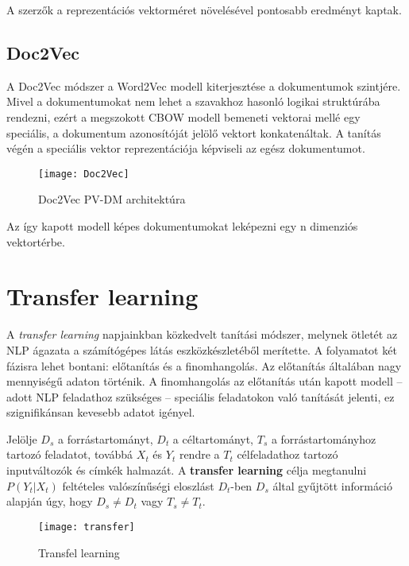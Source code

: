 \begin{note}
	A szerzők a reprezentációs vektorméret növelésével pontosabb eredményt kaptak.
\end{note}

\subsection{Doc2Vec}
A Doc2Vec módszer a Word2Vec modell kiterjesztése a dokumentumok szintjére. Mivel a dokumentumokat nem lehet a szavakhoz hasonló logikai struktúrába rendezni, ezért a megszokott CBOW modell bemeneti vektorai mellé egy speciális, a dokumentum azonosítóját jelölő vektort konkatenáltak. A tanítás végén a speciális vektor reprezentációja képviseli az egész dokumentumot.

\begin{figure}[H]
	\centering
	\texttt{[image: Doc2Vec]}
	\caption{Doc2Vec PV-DM architektúra}
\end{figure}

Az így kapott modell képes dokumentumokat leképezni egy n dimenziós vektortérbe.

\section{Transfer learning}

A \textit{transfer learning} napjainkban közkedvelt tanítási módszer, melynek ötletét az NLP ágazata a számítógépes látás eszközkészletéből merítette. A folyamatot két fázisra lehet bontani: előtanítás és a finomhangolás. Az előtanítás általában nagy mennyiségű adaton történik. A finomhangolás az előtanítás után kapott modell – adott NLP feladathoz szükséges – speciális feladatokon való tanítását jelenti, ez szignifikánsan kevesebb adatot igényel.

\begin{definition}
	Jelölje $D_s$ a forrástartományt, $D_t$ a céltartományt, $T_s$ a forrástartományhoz tartozó feladatot, továbbá $X_t$ és $Y_t$ rendre a $T_t$ célfeladathoz tartozó inputváltozók és  címkék halmazát. A \textbf{transfer learning} célja megtanulni $P(Y_t|X_t)$ feltételes valószínűségi eloszlást $D_t$-ben $D_s$ által gyűjtött információ alapján úgy, hogy $D_s \neq D_t$ vagy $T_s \neq T_t$.	 
\end{definition}

\begin{figure}[H]
	\centering
	\texttt{[image: transfer]}
	\caption{Transfel learning}
\end{figure}







